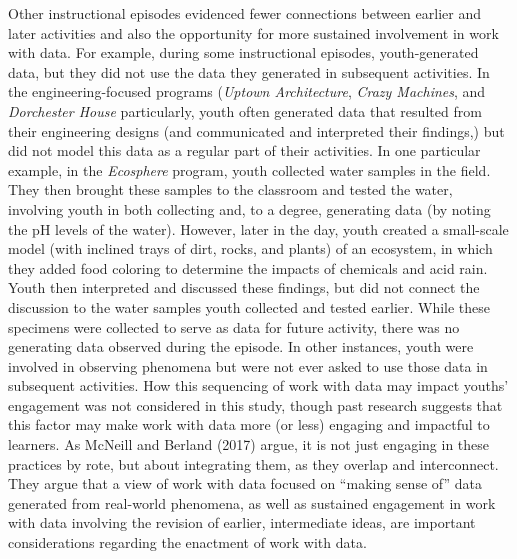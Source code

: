 \documentclass[]{msu-thesis}
\theoremstyle{definition}
\theoremstyle{definition}
\theoremstyle{definition}
\theoremstyle{remark}
\begin{document}
Other instructional episodes evidenced fewer connections between earlier
and later activities and also the opportunity for more sustained
involvement in work with data. For example, during some instructional
episodes, youth-generated data, but they did not use the data they
generated in subsequent activities. In the engineering-focused programs
(\emph{Uptown Architecture}, \emph{Crazy Machines}, and \emph{Dorchester
House} particularly, youth often generated data that resulted from their
engineering designs (and communicated and interpreted their findings,)
but did not model this data as a regular part of their activities. In
one particular example, in the \emph{Ecosphere} program, youth collected
water samples in the field. They then brought these samples to the
classroom and tested the water, involving youth in both collecting and,
to a degree, generating data (by noting the pH levels of the water).
However, later in the day, youth created a small-scale model (with
inclined trays of dirt, rocks, and plants) of an ecosystem, in which
they added food coloring to determine the impacts of chemicals and acid
rain. Youth then interpreted and discussed these findings, but did not
connect the discussion to the water samples youth collected and tested
earlier. While these specimens were collected to serve as data for
future activity, there was no generating data observed during the
episode. In other instances, youth were involved in observing phenomena
but were not ever asked to use those data in subsequent activities. How
this sequencing of work with data may impact youths' engagement was not
considered in this study, though past research suggests that this factor
may make work with data more (or less) engaging and impactful to
learners. As McNeill and Berland (2017) argue, it is not just engaging
in these practices by rote, but about integrating them, as they overlap
and interconnect. They argue that a view of work with data focused on
``making sense of'' data generated from real-world phenomena, as well as
sustained engagement in work with data involving the revision of
earlier, intermediate ideas, are important considerations regarding the
enactment of work with data.
\end{document}
